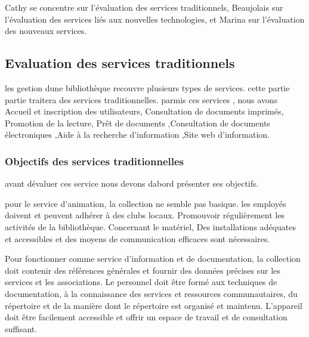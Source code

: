 \documentclass[french,a4paper,12pt]{article}
\begin{document}
Cathy se concentre sur l’évaluation des services traditionnels, Beaujolais sur l’évaluation des services liés aux nouvelles technologies, et Marina sur l’évaluation des nouveaux services.



\subsection{Evaluation des services traditionnels}


\quad les gestion dune bibliothèque recouvre plusieurs types de services. cette partie partie traitera des services traditionnelles. parmis ces services , nous avons Accueil et inscription des utilisateurs, Consultation de documents imprimés, Promotion de la lecture, Prêt de documents ,Consultation de documents électroniques ,Aide à la recherche d’information ,Site web d’information.  


\subsubsection{Objectifs des services traditionnelles}

\quad avant dévaluer ces service nous devons dabord présenter ses objectifs.

\quad pour le service  d'animation, la collection ne semble pas basique.  les employés doivent et peuvent adhérer à des clubs locaux. Promouvoir régulièrement les activités de la bibliothèque. Concernant le matériel, Des installations adéquates et accessibles et des moyens de communication efficaces sont nécessaires. 

\quad Pour fonctionner comme service d'information et de documentation, la collection doit contenir des références générales et fournir des données précises sur les services et les associations. Le personnel doit être formé aux techniques de documentation, à la connaissance des services et ressources communautaires, du répertoire et de la manière dont le répertoire est organisé et maintenu. L'appareil doit être facilement accessible et offrir un espace de travail et de consultation suffisant.  
\end{document}

